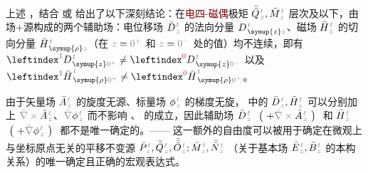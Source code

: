 上述 ，结合  或  给出了以下深刻结论：在\textcolor{Maroon}{电四-磁偶}极矩 $\bar{\bar{Q}}^{\;\!\mathcolor{gray}{t}}_{\;\!\mathcolor{gray}{z}}, \bar{M}^{\;\!\mathcolor{gray}{t}}_{\;\!\mathcolor{gray}{z}}$ 层次及以下，由场$+$源构成的两个辅助场：电位移场 $\bar{D}^{\;\!\mathcolor{gray}{t}}_{\;\!\mathcolor{gray}{z}}$ 的法向分量 $D^{\;\!\mathcolor{gray}{t}}_{\;\! \symup{z} \mathcolor{gray}{z}}$、磁场 $\bar{H}^{\;\!\mathcolor{gray}{t}}_{\;\!\mathcolor{gray}{z}}$ 的切向分量 $\bar{H}^{\;\!\mathcolor{gray}{t}}_{\;\! \symup{\rho} \mathcolor{gray}{z}}$（在 $\mathcolor{gray}{z \mathcolor{black}{=} 0^+}$ 和 $\mathcolor{gray}{z \mathcolor{black}{=} 0^-}$ 处的值）均不连续，即有 $\leftindex^{\textcolor{Maroon}{1}} D^{\;\!\mathcolor{gray}{t}}_{\;\! \symup{z} \mathcolor{gray}{0^+}} \neq \leftindex^{\textcolor{Maroon}{0}} D^{\;\!\mathcolor{gray}{t}}_{\;\! \symup{z} \mathcolor{gray}{0^-}}$ 以及 $\leftindex^{\textcolor{Maroon}{1}} {\bar{H}}^{\;\!\mathcolor{gray}{t}}_{\;\! \symup{\rho} \mathcolor{gray}{0^+}} \neq \leftindex^{\textcolor{Maroon}{0}} {\bar{H}}^{\;\!\mathcolor{gray}{t}}_{\;\! \symup{\rho} \mathcolor{gray}{0^-}}$。

由于矢量场 $\bar{A}^{\;\!\mathcolor{gray}{t}}_{\;\!\mathcolor{gray}{z}}$ 的旋度无源、标量场 $\phi^{\;\!\mathcolor{gray}{t}}_{\;\!\mathcolor{gray}{z}}$ 的梯度无旋， 中的 $\bar{D}^{\;\!\mathcolor{gray}{t}}_{\;\!\mathcolor{gray}{z}}, \bar{H}^{\;\!\mathcolor{gray}{t}}_{\;\!\mathcolor{gray}{z}}$ 可以分别加上 $\mathcolor{gray}{\bar{\nabla} \times} \bar{A}^{\;\!\mathcolor{gray}{t}}_{\;\!\mathcolor{gray}{z}}$、$\mathcolor{gray}{\bar{\nabla}} \phi^{\;\!\mathcolor{gray}{t}}_{\;\!\mathcolor{gray}{z}}$ 而不影响 、 的成立，因此辅助场 $\bar{D}^{\;\!\mathcolor{gray}{t}}_{\;\!\mathcolor{gray}{z}}$ $~\left(~ + \mathcolor{gray}{\bar{\nabla} \times} \bar{A}^{\;\!\mathcolor{gray}{t}}_{\;\!\mathcolor{gray}{z}} ~\right)~$ 和 $\bar{H}^{\;\!\mathcolor{gray}{t}}_{\;\!\mathcolor{gray}{z}}$ $~\left(~ + \mathcolor{gray}{\bar{\nabla}} \phi^{\;\!\mathcolor{gray}{t}}_{\;\!\mathcolor{gray}{z}} ~\right)~$ 都不是唯一确定的。—— 这一额外的自由度可以被用于确定在微观上与坐标原点无关的平移不变源 $\bar{P}^{\;\!\mathcolor{gray}{t}}_{\;\!\mathcolor{gray}{z}},\bar{\bar{Q}}^{\;\!\mathcolor{gray}{t}}_{\;\!\mathcolor{gray}{z}},\bar{\bar{\bar{O}}}^{\;\!\mathcolor{gray}{t}}_{\;\!\mathcolor{gray}{z}} ; \bar{M}^{\;\!\mathcolor{gray}{t}}_{\;\!\mathcolor{gray}{z}}, \bar{\bar{N}}^{\;\!\mathcolor{gray}{t}}_{\;\!\mathcolor{gray}{z}}$ （关于基本场 $\bar{E}^{\;\!\mathcolor{gray}{t}}_{\;\!\mathcolor{gray}{z}}, \bar{B}^{\;\!\mathcolor{gray}{t}}_{\;\!\mathcolor{gray}{z}}$ 的本构关系）的唯一确定且正确的宏观表达式\cite{welterTranslationallyInvariantSemiclassical2013,delangeTranslationalInvariancePost2012,langeTransitionMicroscopicMacroscopic2012,langeMultipoleTheoryHehl2015,raabCommentOriginDependence2010a,OriginindependentCalculationQuadrupole}。

